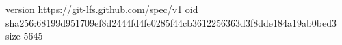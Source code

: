 version https://git-lfs.github.com/spec/v1
oid sha256:68199d951709ef8d2444fd4fe0285f44cb3612256363d3f8dde184a19ab0bed3
size 5645
